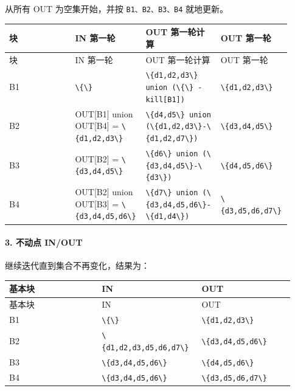 \documentclass[UTF8]{ctexart}
\begin{document}
从所有 OUT 为空集开始，并按 \texttt{B1、B2、B3、B4} 就地更新。

\begin{longtable}{|p{0.23\linewidth}|p{0.23\linewidth}|p{0.23\linewidth}|p{0.23\linewidth}|}
\hline
块 & IN 第一轮 & OUT 第一轮计算 & OUT 第一轮 \\
\hline
\endfirsthead
块 & IN 第一轮 & OUT 第一轮计算 & OUT 第一轮 \\
\hline
\endhead
B1 & \texttt{\textbackslash{}\{\textbackslash{}\}} & \texttt{\textbackslash{}\{d1,d2,d3\textbackslash{}\} union (\textbackslash{}\{\textbackslash{}\} - kill[B1])} & \texttt{\textbackslash{}\{d1,d2,d3\textbackslash{}\}} \\
\hline
B2 & OUT[B1] union OUT[B4] = \texttt{\textbackslash{}\{d1,d2,d3\textbackslash{}\}} & \texttt{\textbackslash{}\{d4,d5\textbackslash{}\} union (\textbackslash{}\{d1,d2,d3\textbackslash{}\}-\textbackslash{}\{d1,d2,d7\textbackslash{}\})} & \texttt{\textbackslash{}\{d3,d4,d5\textbackslash{}\}} \\
\hline
B3 & OUT[B2] = \texttt{\textbackslash{}\{d3,d4,d5\textbackslash{}\}} & \texttt{\textbackslash{}\{d6\textbackslash{}\} union (\textbackslash{}\{d3,d4,d5\textbackslash{}\}-\textbackslash{}\{d3\textbackslash{}\})} & \texttt{\textbackslash{}\{d4,d5,d6\textbackslash{}\}} \\
\hline
B4 & OUT[B2] union OUT[B3] = \texttt{\textbackslash{}\{d3,d4,d5,d6\textbackslash{}\}} & \texttt{\textbackslash{}\{d7\textbackslash{}\} union (\textbackslash{}\{d3,d4,d5,d6\textbackslash{}\}-\textbackslash{}\{d1,d4\textbackslash{}\})} & \texttt{\textbackslash{}\{d3,d5,d6,d7\textbackslash{}\}} \\
\hline
\end{longtable}

\paragraph*{3. 不动点 IN/OUT}

继续迭代直到集合不再变化，结果为：

\begin{longtable}{|p{0.31\linewidth}|p{0.31\linewidth}|p{0.31\linewidth}|}
\hline
基本块 & IN & OUT \\
\hline
\endfirsthead
基本块 & IN & OUT \\
\hline
\endhead
B1 & \texttt{\textbackslash{}\{\textbackslash{}\}} & \texttt{\textbackslash{}\{d1,d2,d3\textbackslash{}\}} \\
\hline
B2 & \texttt{\textbackslash{}\{d1,d2,d3,d5,d6,d7\textbackslash{}\}} & \texttt{\textbackslash{}\{d3,d4,d5,d6\textbackslash{}\}} \\
\hline
B3 & \texttt{\textbackslash{}\{d3,d4,d5,d6\textbackslash{}\}} & \texttt{\textbackslash{}\{d4,d5,d6\textbackslash{}\}} \\
\hline
B4 & \texttt{\textbackslash{}\{d3,d4,d5,d6\textbackslash{}\}} & \texttt{\textbackslash{}\{d3,d5,d6,d7\textbackslash{}\}} \\
\hline
\end{longtable}
\end{document}
